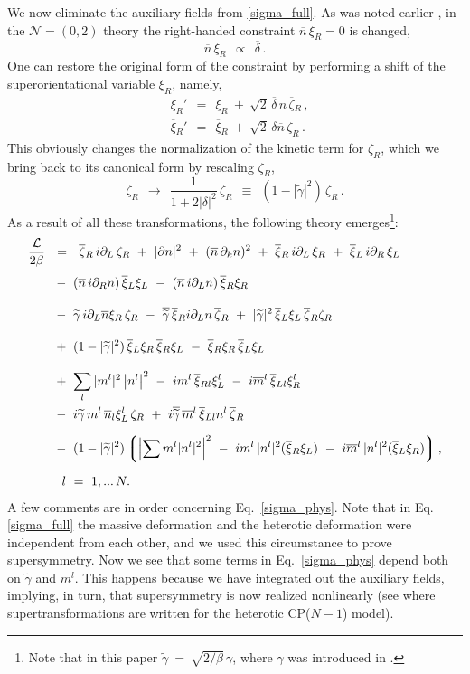 \documentclass[12pt]{article}
\newcommand{\ntwoo}{${\mathcal N}= \left(0,2\right) $ }
\newcommand{\p}{\partial}
\newcommand{\wt}{\widetilde}
\newcommand{\ov}{\overline}
\newcommand{\mc}[1]{\mathcal{#1}}
\newcommand{\lgr}{\left\lgroup}
\newcommand{\rgr}{\right\rgroup}
\newcommand{\bxir}{\ov{\xi}{}_R}
\newcommand{\bxil}{\ov{\xi}{}_L}
\newcommand{\xir}{\xi_R}
\newcommand{\xil}{\xi_L}
\newcommand{\bzr}{\ov{\zeta}{}_R}
\newcommand{\zr}{\zeta_R}
\newcommand{\nbar}{\ov{n}}
\newcommand{\tgamma}{\wt{\gamma}}
\begin{document}
        We now eliminate the auxiliary fields from \eqref{sigma_full}. 
        As was noted earlier \cite{Edalati}, in the \ntwoo theory the right-handed constraint $ \nbar\,\xir = 0 $ is
changed,
\[
	\nbar\, \xir ~~\propto~~ \ov{\delta}\,.
\]
One can restore the original form of 
the constraint  by performing a shift of the superorientational variable $ \xir $, namely,
\begin{align*}
%
	& \xi_R' ~~=~~ \xir ~+~ \sqrt{2}\, \ov{\delta}\, n\, \bzr \,, \\[1mm]
%
	& \ov{\xi}{}_R' ~~=~~ \bxir ~+~ \sqrt{2}\, \delta \nbar\, \zr\,.
\end{align*}
	This obviously changes the normalization of the kinetic term for $ \zr $, which we
	bring back to its canonical form by rescaling $ \zr $,
\[
	\zr ~~\to~~ \frac{1}{1 + 2|\delta|^2}\,\zr ~~\equiv~~ ( 1 - |\tgamma|^2 )\, \zr\,.
\]
As a result of all these transformations,  the following theory emerges\footnote{Note that in 
this paper $ \tgamma ~=~ \sqrt{2/\beta}\,\gamma $, where 
$\gamma$ was introduced in \cite{SYhet}.}:
\begin{align}
%
\notag
	\frac{\mc{L}}{2\beta} & ~~=~~ \bzr\, i\p_L\, \zr ~+~ 
		| \p n |^2  ~+~ (\nbar\, \p_k n)^2 ~+~ \bxir\, i\p_L\, \xir ~+~ \bxil\, i\p_R\, \xil
	\\[1mm]
%
\notag
	&~ 
	~-~ (\nbar\, i\p_R n)\, \bxil \xil ~-~  (\nbar\, i\p_L n)\, \bxir \xir
	\\[3mm]
%
\notag
	&~
	~-~ \tgamma\, i\p_L\nbar \xir\, \zr ~-~ \ov{\tgamma}\, \bxir i\p_L n\, \bzr
	~+~ |\tgamma|^2\, \bxil \xil\, \bzr \zr
	\\[3mm]
%
\label{sigma_phys}
	&~
	~+~ (1-|\tgamma|^2)\,\bxil\xir\,\bxir\xil ~-~ \bxir\xir\,\bxil\xil
	\\[3mm]
%	
\notag
	&~
	~+~ \sum_l |m^l|^2 \left|n^l \right|^2 
	~-~ i m^l\, \ov{\xi}{}_{Rl} \xi_L^l ~-~ i\ov{m}{}^l\, \ov{\xi}{}_{Ll} \xi_R^l
	\\
%
\notag
	&~
	~-~ i\tgamma\, m^l\, \ov{n}{}_l \xi_L^l\, \zr 
	~+~ i\ov{\tgamma}\, \ov{m}{}^l\, \ov{\xi}{}_{Ll} n^l\, \bzr
	\\[2mm]
%
\notag
	&~
	~-~ (1-|\tgamma|^2)
	\lgr \left|\sum m^l |n^l|^2 \right|^2 
		~-~ i m^l\, |n^l|^2 (\bxir\xil) ~-~ i\ov{m}{}^l\, |n^l|^2(\bxil\xir)
	\rgr ,
	\\[2mm]
%
\notag
	&
	~~~~  l ~=~ 1,...\,N.
\end{align}	
	A few comments are in order concerning Eq.~\eqref{sigma_phys}. 
	Note that in Eq. \eqref{sigma_full} the massive deformation and the heterotic deformation
	were independent from each other, and we used this
	circumstance to prove supersymmetry.
	Now we see that some terms in Eq.~\eqref{sigma_phys}  depend both on $\tgamma$ and
	$m^l$.
	This happens because we have integrated out the auxiliary fields, implying, in turn,  
 that supersymmetry is now realized nonlinearly 
	(see \cite{BSYhet} where supertransformations are written for the
	heterotic CP($N-1$) model).
\end{document}
